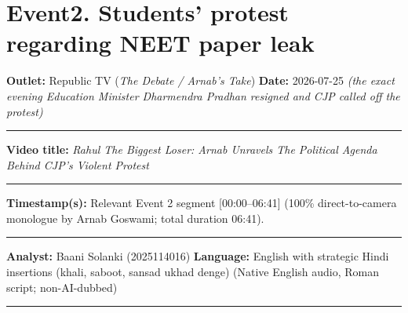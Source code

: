 \documentclass[10pt,a4paper]{article}
\newcommand{\formrule}{\par\vspace{3pt}\noindent\rule{\textwidth}{0.35pt}\par\vspace{7pt}}
\newcommand{\sectionrule}{\par\vspace{4pt}\noindent\rule{\textwidth}{0.4pt}\par\vspace{8pt}}
\begin{document}
\newpage
\section*{Event2. Students' protest regarding NEET paper leak}
\par\vspace{6pt}
{\small
\noindent\textbf{Outlet:} Republic TV (\emph{The Debate / Arnab's Take}) \hfill \textbf{Date:} 2026-07-25 \emph{(the exact evening Education Minister Dharmendra Pradhan resigned and CJP called off the protest)}
\formrule
\noindent\textbf{Video title:} \emph{Rahul The Biggest Loser: Arnab Unravels The Political Agenda Behind CJP's Violent Protest}
\formrule
\noindent\textbf{Timestamp(s):} Relevant Event 2 segment [00:00--06:41] (100\% direct-to-camera monologue by Arnab Goswami; total duration 06:41).
\formrule
\noindent\textbf{Analyst:} Baani Solanki (2025114016) \hfill \textbf{Language:} English with strategic Hindi insertions (khali, saboot, sansad ukhad denge) (Native English audio, Roman script; non-AI-dubbed)
}
\sectionrule
\end{document}

